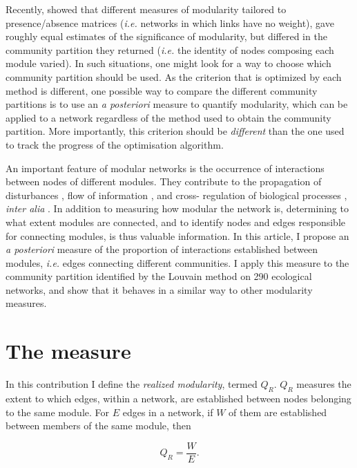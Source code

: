 \documentclass[12pt,oneside]{article}
\begin{document}
Recently, \textcite{thebault_identifying_2012} showed that different
measures of modularity tailored to presence/absence matrices (\emph{i.e.}
networks in which links have no weight), gave roughly equal estimates of
the significance of modularity, but differed in the community partition they
returned (\emph{i.e.} the identity of nodes composing each module varied). In
such situations, one might look for a way to choose which community partition
should be used. As the criterion that is optimized by each method is different,
one possible way to compare the different community partitions is to use an
\emph{a posteriori} measure to quantify modularity, which can be applied to a
network regardless of the method used to obtain the community partition. More
importantly, this criterion should be \emph{different} than the one used to
track the progress of the optimisation algorithm.

An important feature of modular networks is the occurrence of interactions
between nodes of different modules. They contribute to the propagation of
disturbances \parencite{olesen_modularity_2007}, flow of information
\cite{wiederhold_mediators_1992,leskovec_statistical_2008}, and cross-
regulation of biological processes \cite{hartwell_molecular_1999}, \emph{inter
alia} \cite{rosvall_maps_2008}. In addition to measuring how modular the
network is, determining to what extent modules are connected, and to
identify nodes and edges responsible for connecting modules, is thus 
valuable information. In this article, I propose an \emph{a posteriori}
measure of the proportion of interactions established between modules,
\emph{i.e.} edges connecting different communities. I apply this measure to
the community partition identified by the Louvain method on 290 ecological
networks, and show that it behaves in a similar way to other modularity
measures.

\section{The measure}

In this contribution I define the \emph{realized modularity}, termed $Q_R$.
$Q_R$ measures the extent to which edges, within a network, are established
between nodes belonging to the same module. For $E$ edges in a network, if $W$
of them are established between members of the same module, then

\begin{equation}
Q_R = \frac{W}{E} .
\label{e:qr}
\end{equation} 
\end{document}
